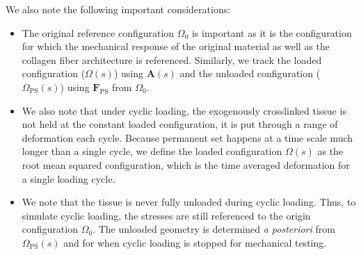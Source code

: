 We also note the following important considerations:
\begin{itemize}
\item The original reference configuration $\Omega_0$ is important as it is the configuration for which the mechanical response of the original material as well as the collagen fiber architecture is referenced. 
Similarly, we track the loaded configuration ($\Omega(s)$) using $\mathbf{A}(s)$ and the unloaded configuration ($\Omega_\mathrm{PS}(s)$) using $\mathbf{F}_\mathrm{PS}$ from $\Omega_0$. 

\item We also note that under cyclic loading, the exogenously crosslinked tissue is not held at the constant loaded configuration, it is put through a range of deformation each cycle. Because permanent set happens at a time scale much longer than a single cycle, we define the loaded configuration $\Omega(s)$ as the root mean squared configuration, which is the time averaged deformation for a single loading cycle. 


\item We note that the tissue is never fully unloaded during cyclic loading. Thus, to simulate cyclic loading, the stresses are still referenced to the origin configuration $\Omega_0$. The unloaded geometry is determined \textit{a posteriori} from $\Omega_\mathrm{PS}(s)$ and for when cyclic loading is stopped for mechanical testing. 
\end{itemize}


